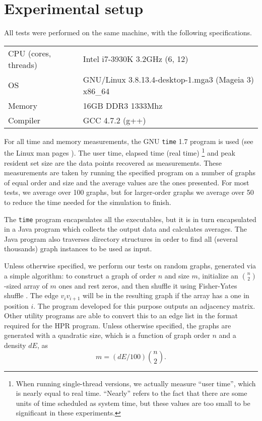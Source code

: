 \documentclass{cslthse-msc}
\newcommand{\code}{\texttt}
\newcommand{\density}{dE}
\begin{document}
\section{Experimental setup}\label{experimentalsetup}
All tests were performed on the same machine, with the following specifications.

\begin{center}
\begin{tabular}{l|l}
CPU (cores, threads) & Intel i7-3930K 3.2GHz (6, 12) \\ 
OS & GNU/Linux 3.8.13.4-desktop-1.mga3 (Mageia 3) x86\_64 \\ 
Memory & 16GB DDR3 1333Mhz \\ 
Compiler & GCC 4.7.2 (g++) \\ 
\end{tabular}
\end{center}

For all time and memory measurements, the GNU \code{time} 1.7 program is used (see the Linux man pages \cite{time}). The user time, elapsed time (real time)
\footnote{When running single-thread versions, we actually measure ``user time'', which is nearly equal to real time. ``Nearly'' refers to the fact that there are some units of time scheduled as system time, but these values are too small to be significant in these experiments.}
and peak resident set size are the data points recovered as measurements. These measurements are taken by running the specified program on a number of graphs of equal order and size and the average values are the ones presented. For most tests, we average over 100 graphs, but for larger-order graphs we average over 50 to reduce the time needed for the simulation to finish.

The \code{time} program encapsulates all the executables, but it is in turn encapsulated in a Java program which collects the output data and calculates averages. The Java program also traverses directory structures in order to find all (several thousands) graph instances to be used as input.

Unless otherwise specified, we perform our tests on random graphs, generated via a simple algorithm: to construct a graph of order $n$ and size $m$, initialize an $\binom{n}{2}$-sized array of $m$ ones and rest zeros, and then shuffle it using Fisher-Yates shuffle \cite[p. 145]{knuth2}. The edge $v_iv_{i+1}$ will be in the resulting graph if the array has a one in position $i$. The program developed for this purpose outputs an adjacency matrix. Other utility programs are able to convert this to an edge list in the format required for the HPR program. Unless otherwise specified, the graphs are generated with a quadratic size, which is a function of graph order $n$ and a density $\density{}$, as
\[ m = (\density{} / 100) \binom{n}{2}.\]
\end{document}

